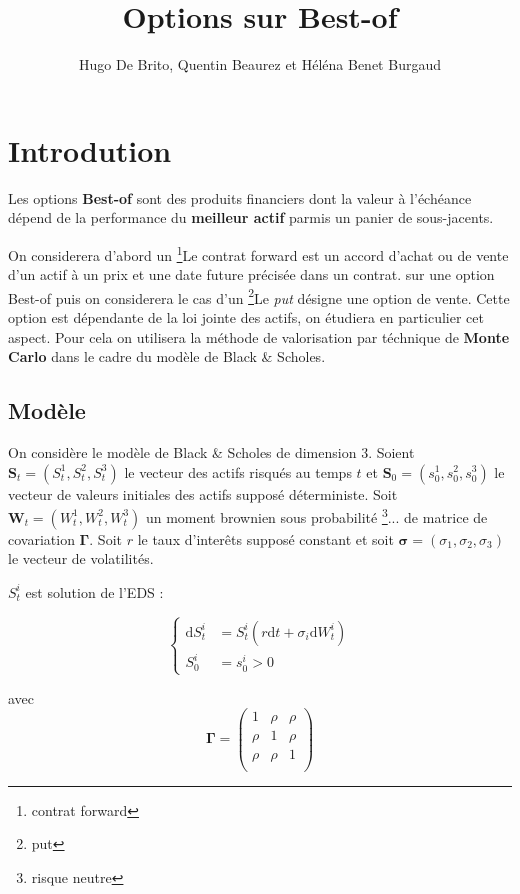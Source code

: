 \documentclass{article}
\title{Options sur Best-of}
\author{Hugo De Brito, Quentin Beaurez et Héléna Benet Burgaud}
\newcommand{\1}{\mathbbm{1}}
\renewcommand{\d}{\mathrm{d}}
\begin{document}
\maketitle

\section{Introdution}
Les options \textbf{Best-of} sont des produits financiers dont la valeur à l'échéance dépend de la performance du \textbf{meilleur actif} parmis un panier de sous-jacents.


On considerera d'abord un \footnote{contrat forward}{Le {contrat forward} est un accord d'achat ou de vente d'un actif à un prix et une date future précisée dans un contrat.} sur une option Best-of puis on considerera le cas d'un \footnote{put}{Le \textit{put} désigne une option de vente}. Cette option est dépendante de la loi jointe des actifs, on étudiera en particulier cet aspect. Pour cela on utilisera la méthode de valorisation par téchnique de \textbf{Monte Carlo} dans le cadre du modèle de Black \& Scholes.

\subsection{Modèle}

On considère le modèle de Black \& Scholes de dimension 3. Soient $\bm S_t = (S^1_t, S^2_t, S^3_t)$ le vecteur des actifs risqués au temps $t$
et $\bm S_0 = (s^1_0, s^2_0, s^3_0)$ le vecteur de valeurs initiales des actifs supposé déterministe. Soit $\bm W_t = (W^1_t, W^2_t, W^3_t)$ un moment brownien sous probabilité \footnote{risque neutre}{...} de matrice de covariation $\bm \Gamma$. Soit $r$ le taux d'interêts supposé constant et soit $\bm \sigma = (\sigma_1, \sigma_2, \sigma_3)$ le vecteur de volatilités.

$S^i_t$ est solution de l'EDS :

\begin{equation}
  \begin{cases}\label{EDS:BlackScholes}
    \d S^i_t &= S^i_t (r \d t + \sigma_i \d W^i_t)\\
    S^i_0 &= s^i_0 > 0
  \end{cases}
\end{equation}

avec
\begin{equation*}
\bm \Gamma = \begin{pmatrix}
          1 & \rho & \rho \\
          \rho & 1 & \rho \\
          \rho & \rho & 1 \\
        \end{pmatrix}
      \end{equation*}
\end{document}
